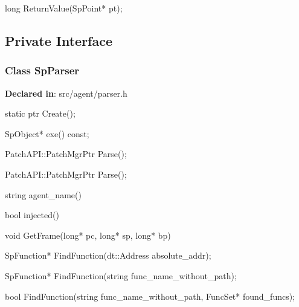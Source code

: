 \begin{apient}
long ReturnValue(SpPoint* pt);
\end{apient}

\subsection{Private Interface}
\subsubsection{Class SpParser}
\textbf{Declared in}: src/agent/parser.h

\begin{apient}
static ptr Create();
\end{apient}
\apidesc{
}

\begin{apient}
SpObject* exe() const;
\end{apient}

\begin{apient}
PatchAPI::PatchMgrPtr Parse();
\end{apient}
\apidesc{
}

\begin{apient}
PatchAPI::PatchMgrPtr Parse();
\end{apient}
\apidesc{
}

\begin{apient}
string agent_name()
\end{apient}
\apidesc{
}

\begin{apient}
bool injected()
\end{apient}
\apidesc{
}

\begin{apient}
void GetFrame(long* pc, long* sp, long* bp)
\end{apient}
\apidesc{
}

\begin{apient}
SpFunction* FindFunction(dt::Address absolute_addr);
\end{apient}
\apidesc{
}

\begin{apient}
SpFunction* FindFunction(string func_name_without_path);
\end{apient}
\apidesc{
}

\begin{apient}
bool FindFunction(string func_name_without_path, FuncSet* found_funcs);
\end{apient}
\apidesc{
}

